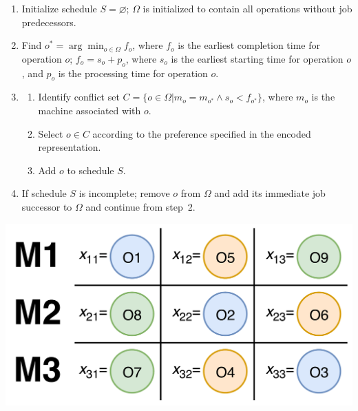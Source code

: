 \documentclass[paper=a4, fontsize=9pt]{scrartcl}
\begin{document}
\begin{multicols}{2}
\begin{enumerate}
    \item Initialize schedule $S=\varnothing$; $\Omega$ is initialized to contain all operations without job predecessors.
    \item Find $o^*=\arg \min_{o \in \Omega} f_o$, where $f_o$ is the earliest completion time for operation $o$; $f_o = s_o + p_o$, where $s_o$ is the earliest starting time for operation $o$, and $p_o$ is the processing time for operation $o$.
    \item \begin{enumerate}
        \item Identify conflict set $C = \{ o \in \Omega \vert m_o = m_{o^*} \land s_o < f_{o^*} \}$, where $m_o$ is the machine associated with $o$.
        \item Select $o \in C$ according to the preference specified in the encoded representation.
        \item Add $o$ to schedule $S$.
    \end{enumerate}
    \item If schedule $S$ is incomplete; remove $o$ from $\Omega$ and add its immediate job successor to $\Omega$ and continue from step~2.
\end{enumerate}

{
\vspace{0.3cm}
\centering
\includegraphics[scale=0.2]{figures/permve-ntnu-it3708-project-4-2017-schedule-representation}
\label{figure:representation}
\vspace{0.3cm}
}


\end{multicols}
\end{document}
